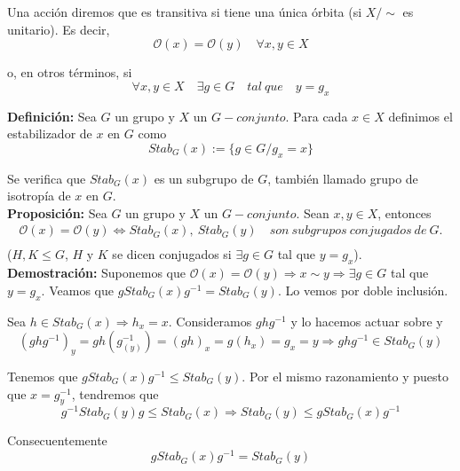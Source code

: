 \documentclass{article}
\begin{document}
Una acción diremos que es transitiva si tiene una única órbita (si $X/\sim$ es unitario). Es decir,
\begin{equation*}
\mathcal{O}(x)=\mathcal{O}(y)\quad \forall x,y\in X
\end{equation*}

o, en otros términos, si 
\begin{equation*}
\forall x,y\in X\quad \exists g\in G\quad tal\:que \quad y=g_x
\end{equation*}

\textbf{Definición:} Sea $G$ un grupo y $X$ un $G-conjunto$. Para cada $x\in X$ definimos el estabilizador de $x$ en $G$ como 
\begin{equation*}
Stab_G(x):=\{g\in G/g_x=x\}
\end{equation*}

Se verifica que $Stab_G(x)$ es un subgrupo de $G$, también llamado grupo de isotropía de $x$ en $G$. \\

\textbf{Proposición:} Sea $G$ un grupo y $X$ un $G-conjunto$. Sean $x,y\in X$, entonces
\begin{gather*}
\mathcal{O}(x)=\mathcal{O}(y)\Leftrightarrow Stab_G(x),\:Stab_G(y)\quad son\:subgrupos\:conjugados\:de\:G. \\
\end{gather*}
($H,K\leq G$, $H$ y $K$ se dicen conjugados si $\exists g\in G$ tal que $y=g_x$). \\

\textbf{Demostración:} Suponemos que $\mathcal{O}(x)=\mathcal{O}(y)\Rightarrow x\sim y\Rightarrow \exists g\in G$ tal que $y=g_x$. Veamos que $gStab_G(x)g^{-1}=Stab_G(y)$. Lo vemos por doble inclusión.

Sea $h\in Stab_G(x)\Rightarrow h_x=x$. Consideramos $ghg^{-1}$ y lo hacemos actuar sobre y
\begin{equation*}
(ghg^{-1})_y=gh(g^{-1}_{(y)})=(gh)_x=g(h_x)=g_x=y\Rightarrow ghg^{-1}\in Stab_G(y)
\end{equation*}

Tenemos que $gStab_G(x)g^{-1}\leq Stab_G(y)$. Por el mismo razonamiento y puesto que $x=g^{-1}_y$, tendremos que
\begin{equation*}
g^{-1}Stab_G(y)g\leq Stab_G(x)\Rightarrow Stab_G(y)\leq gStab_G(x)g^{-1}
\end{equation*}

Consecuentemente
\begin{equation*}
gStab_G(x)g^{-1}=Stab_G(y)
\end{equation*}
\end{document}
